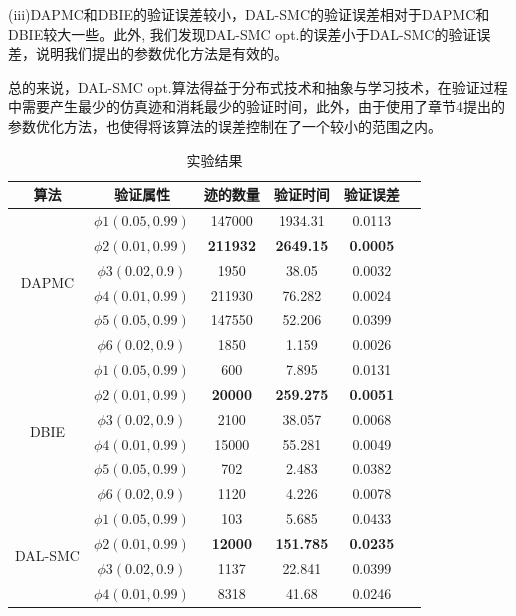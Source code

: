 (iii)DAPMC和DBIE的验证误差较小，DAL-SMC的验证误差相对于DAPMC和DBIE较大一些。此外, 我们发现DAL-SMC opt.的误差小于DAL-SMC的验证误差，说明我们提出的参数优化方法是有效的。

总的来说，DAL-SMC opt.算法得益于分布式技术和抽象与学习技术，在验证过程中需要产生最少的仿真迹和消耗最少的验证时间，此外，由于使用了章节4提出的参数优化方法，也使得将该算法的误差控制在了一个较小的范围之内。

\begin{table}
\caption{实验结果}
\centering
\begin{tabular}{c c c c c c} 
        \hline  
        算法 & 验证属性 & 迹的数量 & 验证时间 & 验证误差\\
        \hline
        \multirow{6}{1.5cm}{DAPMC}  
                & $\phi1(0.05,0.99)$ &  147000&  1934.31&  0.0113\\ 
                & $\phi2(0.01,0.99)$ &  \textbf{211932} &  \textbf{2649.15} &  \textbf{0.0005}\\ 
                & $\phi3(0.02,0.9)$ &  1950&     38.05& 0.0032\\ 
                & $\phi4(0.01,0.99)$ &  211930&  76.282 &  0.0024\\ 
                & $\phi5(0.05,0.99)$ &  147550&  52.206&  0.0399\\ 
                & $\phi6(0.02,0.9)$ &  1850&     1.159& 0.0026\\     
        \hline 
        \multirow{6}{1.5cm}{DBIE}  
                & $\phi1(0.05,0.99)$ &  600&  7.895&  0.0131\\ 
                & $\phi2(0.01,0.99)$ &  \textbf{20000}&  \textbf{259.275} &  \textbf{0.0051} \\ 
                & $\phi3(0.02,0.9)$ &  2100& 38.057& 0.0068\\ 
                & $\phi4(0.01,0.99)$ & 15000&  55.281 &  0.0049\\ 
                & $\phi5(0.05,0.99)$ &  702&  2.483&  0.0382\\ 
                & $\phi6(0.02,0.9)$ &  1120& 4.226& 0.0078\\      
        \hline 
        \multirow{6}{1.5cm}{DAL-SMC}  
                & $\phi1(0.05,0.99)$ &  103&  5.685&  0.0433\\ 
                & $\phi2(0.01,0.99)$ &  \textbf{12000}&  \textbf{151.785} &  \textbf{0.0235} \\ 
                & $\phi3(0.02,0.9)$ &  1137& 22.841& 0.0399\\ 
                & $\phi4(0.01,0.99)$ &  8318&  41.68 &  0.0246\\ 

\end{tabular}
\end{table}

